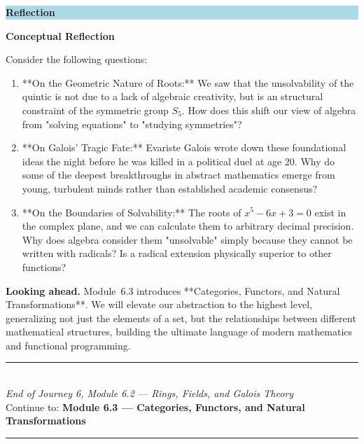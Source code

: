 \documentclass[12pt, a4paper]{article}
\newenvironment{reflectionbox}
  {\par\medskip\fillcolorbox{LightBlue}{ReflectColor}{Reflection}}
  {\par\medskip}
\newcommand{\fillcolorbox}[3]{%
  \noindent
  \filldrawbox{#1}{#2}{\textbf{\sffamily\color{white}#3}}\par\nobreak\vspace{4pt}
}
\newcommand{\filldrawbox}[3]{%
  \colorbox{#1}{\parbox{\dimexpr\linewidth-2\fboxsep\relax}{%
    \vspace{4pt}\noindent\hspace{4pt}#3\vspace{4pt}%
  }}%
}
\begin{document}
\begin{reflectionbox}
\textbf{Conceptual Reflection}

Consider the following questions:
\begin{enumerate}
  \item **On the Geometric Nature of Roots:** We saw that the unsolvability of the quintic is not due to a lack of algebraic creativity, but is an structural constraint of the symmetric group $S_5$. How does this shift our view of algebra from "solving equations" to "studying symmetries"?
  \item **On Galois' Tragic Fate:** Evariste Galois wrote down these foundational ideas the night before he was killed in a political duel at age 20. Why do some of the deepest breakthroughs in abstract mathematics emerge from young, turbulent minds rather than established academic consensus?
  \item **On the Boundaries of Solvability:** The roots of $x^5 - 6x + 3 = 0$ exist in the complex plane, and we can calculate them to arbitrary decimal precision. Why does algebra consider them "unsolvable" simply because they cannot be written with radicals? Is a radical extension physically superior to other functions?
\end{enumerate}
\end{reflectionbox}

\medskip
\noindent\textbf{Looking ahead.}
Module~6.3 introduces **Categories, Functors, and Natural Transformations**. We will elevate our abstraction to the highest level, generalizing not just the elements of a set, but the relationships between different mathematical structures, building the ultimate language of modern mathematics and functional programming.

\vspace{1.4cm}
\begin{center}
{\color{NavyBlue}\rule{0.5\linewidth}{0.8pt}}\\[6pt]
{\small\color{NavyBlue}\textit{End of Journey 6, Module 6.2 --- Rings, Fields, and Galois Theory}}\\[4pt]
{\small\color{NavyBlue}Continue to: \textbf{Module 6.3 --- Categories, Functors, and Natural Transformations}}\\[6pt]
{\color{NavyBlue}\rule{0.5\linewidth}{0.8pt}}
\end{center}
\end{document}
